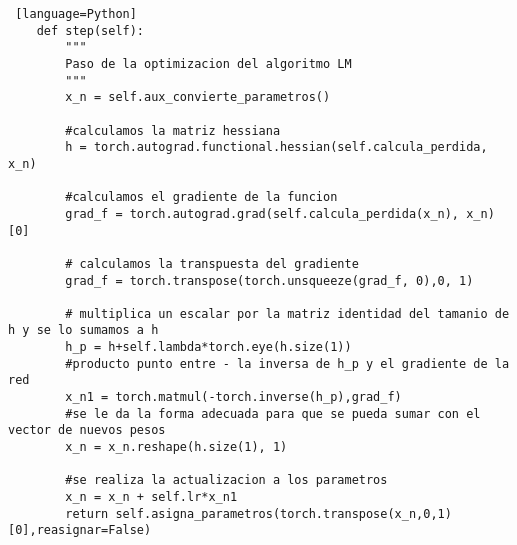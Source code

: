 \begin{lstlisting} [language=Python]
    def step(self):
        """
        Paso de la optimizacion del algoritmo LM
        """
        x_n = self.aux_convierte_parametros() 

        #calculamos la matriz hessiana
        h = torch.autograd.functional.hessian(self.calcula_perdida, x_n) 

        #calculamos el gradiente de la funcion
        grad_f = torch.autograd.grad(self.calcula_perdida(x_n), x_n)[0]

        # calculamos la transpuesta del gradiente
        grad_f = torch.transpose(torch.unsqueeze(grad_f, 0),0, 1) 

        # multiplica un escalar por la matriz identidad del tamanio de h y se lo sumamos a h
        h_p = h+self.lambda*torch.eye(h.size(1))
        #producto punto entre - la inversa de h_p y el gradiente de la red
        x_n1 = torch.matmul(-torch.inverse(h_p),grad_f) 
        #se le da la forma adecuada para que se pueda sumar con el vector de nuevos pesos
        x_n = x_n.reshape(h.size(1), 1)

        #se realiza la actualizacion a los parametros
        x_n = x_n + self.lr*x_n1 
        return self.asigna_parametros(torch.transpose(x_n,0,1)[0],reasignar=False)
\end{lstlisting}
